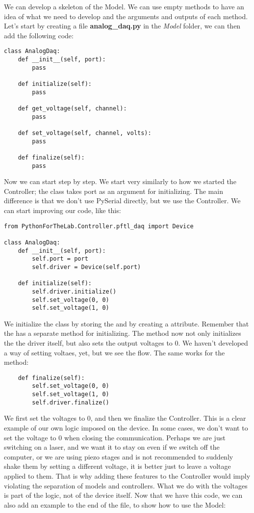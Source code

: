 We can develop a skeleton of the Model. We can use empty methods to have an idea of what we need to develop and the arguments and outputs of each method. Let's start by creating a file \textbf{analog\_daq.py} in the \emph{Model} folder, we can then add the following code:

\begin{verbatim}
class AnalogDaq:
    def __init__(self, port):
        pass

    def initialize(self):
        pass

    def get_voltage(self, channel):
        pass

    def set_voltage(self, channel, volts):
        pass

    def finalize(self):
        pass
\end{verbatim}

Now we can start step by step. We start very similarly to how we started the Controller; the  class takes port as an argument for initializing. The main difference is that we don't use PySerial directly, but we use the Controller. We can start improving our code, like this:

\begin{verbatim}
from PythonForTheLab.Controller.pftl_daq import Device

class AnalogDaq:
    def __init__(self, port):
        self.port = port
        self.driver = Device(self.port)

    def initialize(self):
        self.driver.initialize()
        self.set_voltage(0, 0)
        self.set_voltage(1, 0)
\end{verbatim}

We initialize the class by storing the  and by creating a  attribute. Remember that the  has a separate method for initializing. The  method now not only initializes the the driver itself, but also sets the output voltages to 0. We haven't developed a way of setting voltaes, yet, but we see the flow. The same works for the  method:

\begin{verbatim}
    def finalize(self):
        self.set_voltage(0, 0)
        self.set_voltage(1, 0)
        self.driver.finalize()
\end{verbatim}

We first set the voltages to $0$, and then we finalize the Controller. This is a clear example of our own logic imposed on the device. In some cases, we don't want to set the voltage to 0 when closing the communication. Perhaps we are just switching on a laser, and we want it to stay on even if we switch off the computer, or we are using piezo stages and is not recommended to suddenly shake them by setting a different voltage, it is better just to leave a voltage applied to them. That is why adding these features to the Controller would imply violating the separation of models and controllers. What we do with the voltages is part of the logic, not of the device itself. Now that we have this code, we can also add an example to the end of the file, to show how to use the Model:

